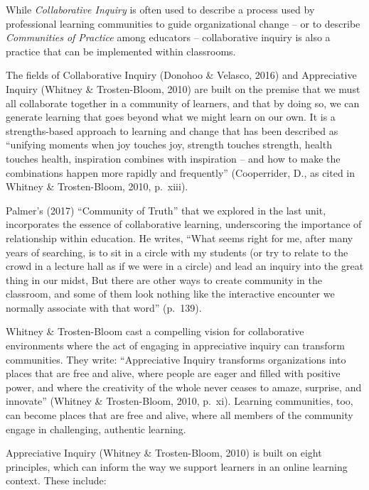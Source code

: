 \documentclass[
]{book}
\begin{document}
While \emph{Collaborative Inquiry} is often used to describe a process used by professional learning communities to guide organizational change -- or to describe \emph{Communities of Practice} among educators -- collaborative inquiry is also a practice that can be implemented within classrooms.

The fields of Collaborative Inquiry (Donohoo \& Velasco, 2016) and Appreciative Inquiry (Whitney \& Trosten-Bloom, 2010) are built on the premise that we must all collaborate together in a community of learners, and that by doing so, we can generate learning that goes beyond what we might learn on our own. It is a strengths-based approach to learning and change that has been described as ``unifying moments when joy touches joy, strength touches strength, health touches health, inspiration combines with inspiration -- and how to make the combinations happen more rapidly and frequently'' (Cooperrider, D., as cited in Whitney \& Trosten-Bloom, 2010, p.~xiii).

Palmer's (2017) ``Community of Truth'' that we explored in the last unit, incorporates the essence of collaborative learning, underscoring the importance of relationship within education. He writes, ``What seems right for me, after many years of searching, is to sit in a circle with my students (or try to relate to the crowd in a lecture hall as if we were in a circle) and lead an inquiry into the great thing in our midst, But there are other ways to create community in the classroom, and some of them look nothing like the interactive encounter we normally associate with that word'' (p.~139).

Whitney \& Trosten-Bloom cast a compelling vision for collaborative environments where the act of engaging in appreciative inquiry can transform communities. They write: ``Appreciative Inquiry transforms organizations into places that are free and alive, where people are eager and filled with positive power, and where the creativity of the whole never ceases to amaze, surprise, and innovate'' (Whitney \& Trosten-Bloom, 2010, p.~xi). Learning communities, too, can become places that are free and alive, where all members of the community engage in challenging, authentic learning.

Appreciative Inquiry (Whitney \& Trosten-Bloom, 2010) is built on eight principles, which can inform the way we support learners in an online learning context. These include:
\end{document}
